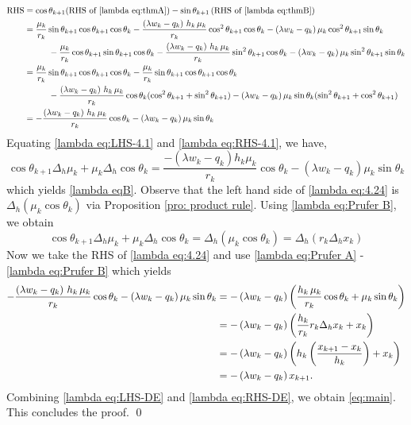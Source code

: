 \documentclass[12pt,reqno]{amsart}
\numberwithin{equation}{section}
\begin{document}
\begin{align}
    \text{RHS}&=\cos\theta_{k+1}(\text{RHS of } \eqref{lambda eq:thmA})-\sin\theta_{k+1}\left(\text{RHS of }\eqref{lambda eq:thmB}\right)\notag\\
    &=\frac{\mu_k}{r_k}\sin\theta_{k+1}\cos\theta_{k+1}\cos\theta_k-\frac{\left(\lambda w_k-q_k\right)\,h_k\,\mu_k}{r_k}\cos^2\theta_{k+1}\cos\theta_k-\left(\lambda w_k-q_k\right)\mu_k\cos^2\theta_{k+1}\sin\theta_k\notag\\
    &\hspace{1cm}-\frac{\mu_k}{r_k}\cos\theta_{k+1}\sin\theta_{k+1}\cos\theta_k-\frac{\left(\lambda w_k-q_k\right)\,h_k\,\mu_k}{r_k}\sin^2\theta_{k+1}\cos\theta_k\notag -\left(\lambda w_k-q_k\right)\mu_k\sin^2\theta_{k+1}\sin\theta_k \\ \notag
    &=\frac{\mu_k}{r_k}\sin\theta_{k+1}\cos\theta_{k+1}\cos\theta_k-\frac{\mu_k}{r_k}\sin\theta_{k+1}\cos\theta_{k+1}\cos\theta_k \\ \notag &\hspace{1cm}-\frac{\left(\lambda w_k-q_k\right)\,h_k\,\mu_k}{r_k}\cos\theta_k(\cos^2\theta_{k+1}+\sin^2\theta_{k+1}) -\left(\lambda w_k-q_k\right)\mu_k\sin\theta_k(\sin^2\theta_{k+1}+\cos^2\theta_{k+1}) \notag\\ 
    &=-\frac{\left(\lambda w_k-q_k\right)\,h_k\,\mu_k}{r_k}\cos\theta_k-\left(\lambda w_k-q_k\right)\mu_k\sin\theta_k
    \label{lambda eq:RHS-4.1}
\end{align}
Equating \eqref{lambda eq:LHS-4.1} and \eqref{lambda eq:RHS-4.1}, we have,
\begin{equation}
\cos\theta_{k+1}\Delta_h\mu_k+\mu_k\Delta_h\cos\theta_k=\frac{-\left(\lambda w_k-q_k\right)h_k\mu_k}{r_k}\cos\theta_k-\left(\lambda w_k-q_k\right)\mu_k\sin\theta_k \label{lambda eq:4.24}
\end{equation}
which yields \eqref{lambda eqB}. Observe that the left hand side of \eqref{lambda eq:4.24} is \(\Delta_h\left(\mu_k\cos\theta_{k}\right)\) via Proposition \ref{pro: product rule}. Using \eqref{lambda eq:Prufer B}, we obtain 
\begin{equation}
\label{lambda eq:LHS-DE}
\cos\theta_{k+1}\Delta_h\mu_k+\mu_k\Delta_h\cos\theta_k  = \Delta_h\left(\mu_k\cos\theta_{k}\right) =  \Delta_h\left(r_k\Delta_h x_k\right)  
\end{equation}
Now we take the RHS of \eqref{lambda eq:4.24} and use \eqref{lambda eq:Prufer A} - \eqref{lambda eq:Prufer B} which yields 
\begin{align}
\label{lambda eq:RHS-DE}
    -\frac{\left(\lambda w_k-q_k\right)\,h_k\,\mu_k}{r_k}\cos\theta_k-\left(\lambda w_k-q_k\right)\mu_k\sin\theta_k &= -\left(\lambda w_k-q_k\right)\left(\frac{h_k\,\mu_k}{r_k}\cos\theta_k+\mu_k\sin\theta_k\right) \notag \\
    & = -\left(\lambda w_k-q_k\right)\left(\frac{h_k}{r_k}r_k\Delta_h x_k+x_k\right)\notag \\
    & = -\left(\lambda w_k-q_k\right) \left(h_k\left(\frac{x_{k+1}-x_k}{h_k}\right)+x_k\right) \notag \\
    & = -\left(\lambda w_k-q_k\right) x_{k+1}.
\end{align}
Combining  \eqref{lambda eq:LHS-DE} and \eqref{lambda eq:RHS-DE}, we obtain \eqref{eq:main}. This concludes the proof. \hfill \qed
\end{document}
